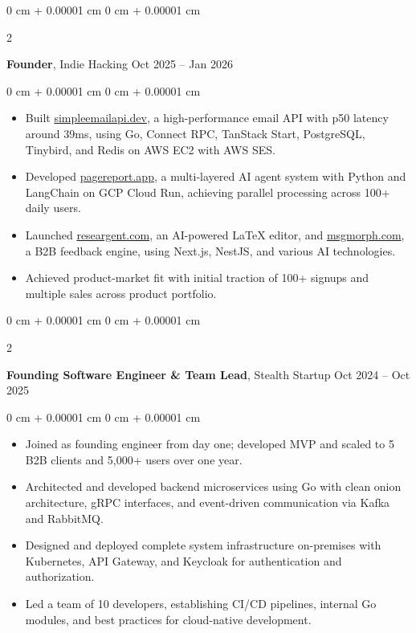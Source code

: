 \documentclass[10pt, letterpaper]{article}
\newenvironment{highlights}{
    \begin{itemize}[
        topsep=0.10 cm,
        parsep=0.10 cm,
        partopsep=0pt,
        itemsep=0pt,
        leftmargin=0 cm + 10pt
    ]
}{
    \end{itemize}
} %
\newenvironment{onecolentry}{
    \begin{adjustwidth}{
        0 cm + 0.00001 cm
    }{
        0 cm + 0.00001 cm
    }
}{
    \end{adjustwidth}
} %
\newenvironment{twocolentry}[2][]{
    \onecolentry
    \def\secondColumn{#2}
    \setcolumnwidth{\fill, 4.5 cm}
    \begin{paracol}{2}
}{
    \switchcolumn \raggedleft \secondColumn
    \end{paracol}
    \endonecolentry
} %
\let\hrefWithoutArrow\href
\begin{document}
    \begin{twocolentry}{
        Oct 2025 – Jan 2026
    }
        \textbf{Founder}, Indie Hacking\end{twocolentry}

    \vspace{0.10 cm}
    \begin{onecolentry}
        \begin{highlights}
            \item Built \hrefWithoutArrow{https://simpleemailapi.dev}{simpleemailapi.dev}, a high-performance email API with p50 latency around 39ms, using Go, Connect RPC, TanStack Start, PostgreSQL, Tinybird, and Redis on AWS EC2 with AWS SES.
            \item Developed \hrefWithoutArrow{https://pagereport.app}{pagereport.app}, a multi-layered AI agent system with Python and LangChain on GCP Cloud Run, achieving parallel processing across 100+ daily users.
            \item Launched \hrefWithoutArrow{https://researgent.com}{researgent.com}, an AI-powered LaTeX editor, and \hrefWithoutArrow{https://msgmorph.com}{msgmorph.com}, a B2B feedback engine, using Next.js, NestJS, and various AI technologies.
            \item Achieved product-market fit with initial traction of 100+ signups and multiple sales across product portfolio.
        \end{highlights}
    \end{onecolentry}

    \vspace{0.2 cm}

    \begin{twocolentry}{
        Oct 2024 – Oct 2025
    }
        \textbf{Founding Software Engineer \& Team Lead}, Stealth Startup\end{twocolentry}

    \vspace{0.10 cm}
    \begin{onecolentry}
        \begin{highlights}
            \item Joined as founding engineer from day one; developed MVP and scaled to 5 B2B clients and 5,000+ users over one year.
            \item Architected and developed backend microservices using Go with clean onion architecture, gRPC interfaces, and event-driven communication via Kafka and RabbitMQ.
            \item Designed and deployed complete system infrastructure on-premises with Kubernetes, API Gateway, and Keycloak for authentication and authorization.
            \item Led a team of 10 developers, establishing CI/CD pipelines, internal Go modules, and best practices for cloud-native development.
        \end{highlights}
    \end{onecolentry}
\end{document}
